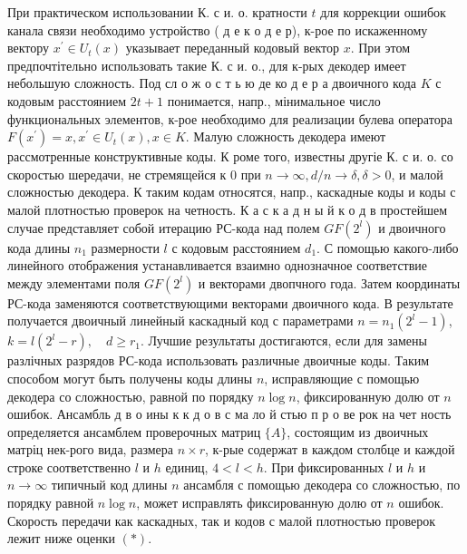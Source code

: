 \documentclass[10pt]{article}
\begin{document}
При практическом использовании К. с и. о. кратности $t$ для коррекции ошибок канала связи необходимо устройство ( д е к о д е р), к-рое по искаженному вектору $x^{\prime} \in U_{t}(x)$ указывает переданный кодовый вектор $x$. При этом предпочтітельно использовать такие К. с и. о., для к-рых декодер имеет небольшую сложность. Под сл о ж о с т ь ю де ко д е р а двоичного кода $K$ с кодовым расстоянием $2 t+1$ понимается, напр., мінимальное число функциональных элементов, к-рое необходимо для реализации булева оператора $F\left(x^{\prime}\right)=x, x^{\prime} \in U_{t}(x), x \in K$. Малую сложность декодера имеют рассмотренные конструктивные коды. К роме того, известны другіе К. с и. о. со скоростью шередачи, не стремящейся к 0 при $n \rightarrow \infty, d / n \rightarrow \delta, \delta>0$, и малой сложностью декодера. К таким кодам относятся, напр., каскадные коды и коды с малой плотностью проверок на четность. К а с к а д н ы й к о д в простейшем случае представляет собой итерацию РС-кода над полем $G F\left(2^{l}\right)$ и двоичного кода длины $n_{1}$ размерности $l$ с кодовым расстоянием $d_{1}$. С помощью какого-либо линейного отображения устанавливается взаимно однозначное соответствие между элементами поля $G F\left(2^{l}\right)$ и векторами двопчного года. Затем координаты РС-кода заменяются соответствующими векторами двоичного кода. В результате получается двоичный линейный каскадный код с параметрами $n=n_{1}\left(2^{l}-1\right)$, $k=l\left(2^{l}-r\right), \quad d \geqslant r_{1}$. Лучшие результаты достигаются, если для замены разлічных разрядов РС-кода использовать различные двоичные коды. Таким способом могут быть получены коды длины $n$, исправляющие с помощью декодера со сложностью, равной по порядку $n \log n$, фиксированную долю от $n$ ошибок. Ансамбль д в о ины к к д о в с ма ло й стью п р о ве рок на чет ность определяется ансамблем проверочных матриц $\{A\}$, состоящим из двоичных матріц нек-рого вида, размера $n \times r$, к-рые содержат в каждом столбце и каждой строке соответственно $l$ и $h$ единиц, $4<l<h$. При фиксированных $l$ и $h$ и $n \rightarrow \infty$ типичный код длины $n$ ансамбля с помощью декодера со сложностью, по порядку равной $n \log n$, может исправлять фиксированную долю от $n$ ошибок. Скорость передачи как каскадных, так и кодов с малой плотностью проверок лежит ниже оценки $(*)$.
\end{document}
